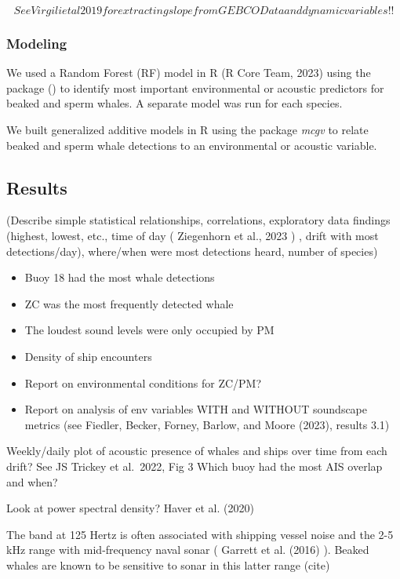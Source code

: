 \documentclass[
]{article}
\begin{document}
\[See Virgili et al 2019 for extracting slope from GEBCO Data and dynamic variables!!\]

\hypertarget{modeling}{%
\subsubsection{\texorpdfstring{\textbf{Modeling}}{Modeling}}\label{modeling}}

We used a Random Forest (RF) model in R (R Core Team, 2023) using the
package () to identify most important environmental or acoustic
predictors for beaked and sperm whales. A separate model was run for
each species.

We built generalized additive models in R using the package \emph{mcgv}
to relate beaked and sperm whale detections to an environmental or
acoustic variable.

\hypertarget{results}{%
\subsection{Results}\label{results}}

(Describe simple statistical relationships, correlations, exploratory
data findings (highest, lowest, etc., time of day ( Ziegenhorn et al.,
2023 ) , drift with most detections/day), where/when were most
detections heard, number of species)

\begin{itemize}
\item
  Buoy 18 had the most whale detections
\item
  ZC was the most frequently detected whale
\item
  The loudest sound levels were only occupied by PM
\item
  Density of ship encounters
\item
  Report on environmental conditions for ZC/PM?
\item
  Report on analysis of env variables WITH and WITHOUT soundscape
  metrics (see Fiedler, Becker, Forney, Barlow, and Moore (2023),
  results 3.1)
\end{itemize}

Weekly/daily plot of acoustic presence of whales and ships over time
from each drift? See JS Trickey et al.~2022, Fig 3 Which buoy had the
most AIS overlap and when?

Look at power spectral density? Haver et al. (2020)

The band at 125 Hertz is often associated with shipping vessel noise and
the 2-5 kHz range with mid-frequency naval sonar ( Garrett et al. (2016)
). Beaked whales are known to be sensitive to sonar in this latter range
(cite)
\end{document}
